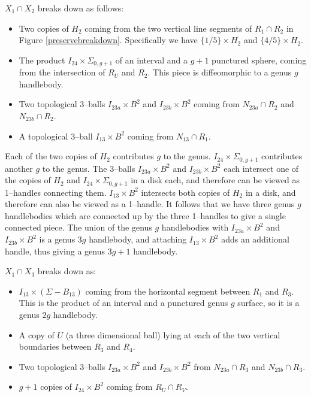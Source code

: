 \documentclass[12pt]{amsart}
\theoremstyle{definition}
\theoremstyle{remark}
\begin{document}
$X_1 \cap X_2$ breaks down as follows:

\begin{itemize}
\item Two copies of $H_2$ coming from the two vertical line segments of $R_1 \cap R_2$ in Figure \ref{preservebreakdown}.  Specifically we have $\{1/5\} \times H_2$ and $\{4/5\} \times H_2$.
\item The product $I_{24} \times \Sigma_{0,g+1}$ of an interval and a $g+1$ punctured sphere, coming from the intersection of $R_U$ and $R_2$.  This piece is diffeomorphic to a genus $g$ handlebody.
\item Two topological 3--balls $I_{23a} \times B^2$ and $I_{23b} \times B^2$ coming from $N_{23a} \cap R_2$ and $N_{23b} \cap R_2$.
\item A topological 3--ball $I_{13} \times B^2$ coming from $N_{13} \cap R_1$.
\end{itemize}

Each of the two copies of $H_2$ contributes $g$ to the genus.  $I_{24} \times \Sigma_{0,g+1}$ contributes another $g$ to the genus.  The 3--balls $I_{23a} \times B^2$ and $I_{23b} \times B^2$ each intersect one of the copies of $H_2$ and $I_{24} \times \Sigma_{0,g+1}$ in a disk each, and therefore can be viewed as 1--handles connecting them.  $I_{13} \times B^2$ intersects both copies of $H_2$ in a disk, and therefore can also be viewed as a 1--handle.  It follows that we have three genus $g$ handlebodies which are connected up by the three 1--handles to give a single connected piece.  The union of the genus $g$ handlebodies with $I_{23a} \times B^2$  and $I_{23b} \times B^2$ is a genus $3g$ handlebody, and attaching $I_{13} \times B^2$ adds an additional handle, thus giving a genus $3g+1$ handlebody.

$X_1 \cap X_3$ breaks down as:

\begin{itemize}
\item $I_{13} \times (\Sigma - B_{13})$ coming from the horizontal segment between $R_1$ and $R_3$.  This is the product of an interval and a punctured genus $g$ surface, so it is a genus $2g$ handlebody.  
\item A copy of $U$ (a three dimensional ball) lying at each of the two vertical boundaries between $R_3$ and $R_4$.
\item Two topological 3--balls $I_{23a} \times B^2$ and $I_{23b} \times B^2$ from $N_{23a} \cap R_3$ and $N_{23b} \cap R_3$.
\item $g+1$ copies of $I_{24} \times B^2$ coming from $R_U \cap R_V$.
\end{itemize}
\end{document}
